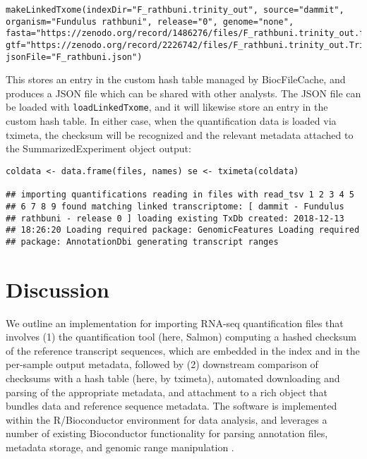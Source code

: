 \documentclass[12pt]{article} \usepackage[utf8]{inputenc}
\begin{document}
\begin{verbatim}
makeLinkedTxome(indexDir="F_rathbuni.trinity_out", source="dammit",
organism="Fundulus rathbuni", release="0", genome="none",
fasta="https://zenodo.org/record/1486276/files/F_rathbuni.trinity_out.fasta",
gtf="https://zenodo.org/record/2226742/files/F_rathbuni.trinity_out.Trinity.fasta.dammit.gff3",
jsonFile="F_rathbuni.json")
\end{verbatim}

This stores an entry in the custom hash table managed by
BiocFileCache, and produces a JSON file which can be shared with other
analysts. The JSON file can be loaded with \texttt{loadLinkedTxome},
and it will likewise store an entry in the custom hash table. In
either case, when the quantification data is loaded via tximeta, the
checksum will be recognized and the relevant metadata attached to the
SummarizedExperiment object output:

\begin{verbatim}
coldata <- data.frame(files, names) se <- tximeta(coldata)

## importing quantifications reading in files with read_tsv 1 2 3 4 5
## 6 7 8 9 found matching linked transcriptome: [ dammit - Fundulus
## rathbuni - release 0 ] loading existing TxDb created: 2018-12-13
## 18:26:20 Loading required package: GenomicFeatures Loading required
## package: AnnotationDbi generating transcript ranges
\end{verbatim}

\section*{Discussion}

We outline an implementation for importing RNA-seq quantification
files that involves (1) the quantification tool (here, Salmon)
computing a hashed checksum of the reference transcript sequences,
which are embedded in the index and in the per-sample output metadata,
followed by (2) downstream comparison of checksums with a hash table
(here, by tximeta), automated downloading and parsing of the
appropriate metadata, and attachment to a rich object that bundles
data and reference sequence metadata. The software is implemented
within the R/Bioconductor environment for data analysis, and leverages
a number of existing Bioconductor functionality for parsing annotation
files, metadata storage, and genomic range manipulation
\citep{bioc,biocfilecache,granges}.
\end{document}
